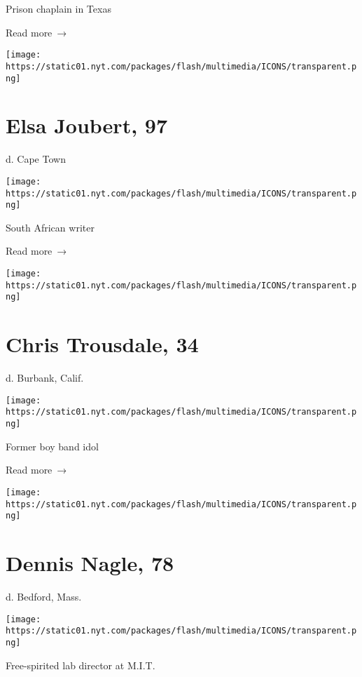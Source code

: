 Prison chaplain in Texas

 Read more~→

\href{https://www.nytimes.com/2020/06/25/books/elsa-joubert-dead-coronavirus.html}{}

\texttt{[image: https://static01.nyt.com/packages/flash/multimedia/ICONS/transparent.png]}

\hypertarget{elsa-joubert-97}{%
\section{Elsa Joubert, 97}\label{elsa-joubert-97}}

d. Cape Town

\texttt{[image: https://static01.nyt.com/packages/flash/multimedia/ICONS/transparent.png]}

South African writer

 Read more~→

\href{https://www.nytimes.com/2020/06/25/obituaries/chris-trousdale-dead-coronavirus.html}{}

\texttt{[image: https://static01.nyt.com/packages/flash/multimedia/ICONS/transparent.png]}

\hypertarget{chris-trousdale-34}{%
\section{Chris Trousdale, 34}\label{chris-trousdale-34}}

d. Burbank, Calif.

\texttt{[image: https://static01.nyt.com/packages/flash/multimedia/ICONS/transparent.png]}

Former boy band idol

 Read more~→

\href{https://www.nytimes.com/2020/06/25/science/dennis-nagle-dead-coronavirus.html}{}

\texttt{[image: https://static01.nyt.com/packages/flash/multimedia/ICONS/transparent.png]}

\hypertarget{dennis-nagle-78}{%
\section{Dennis Nagle, 78}\label{dennis-nagle-78}}

d. Bedford, Mass.

\texttt{[image: https://static01.nyt.com/packages/flash/multimedia/ICONS/transparent.png]}

Free-spirited lab director at M.I.T.

